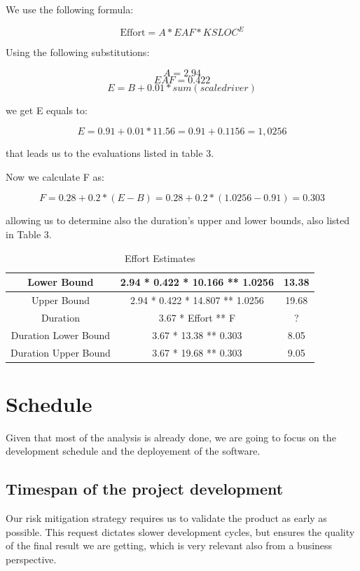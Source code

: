 \documentclass[11pt]{article} %
\begin{document}
We use the following formula:

$$ \text{Effort} = A * EAF * KSLOC ^ E $$

Using the following substitutions:

$$ A = 2.94 $$
$$ EAF = 0.422 $$
$$ E = B + 0.01 * sum(scale driver) $$

we get E equals to: 

$$ E = 0.91 + 0.01 * 11.56 = 0.91 + 0.1156 = 1,0256 $$

that leads us to the evaluations listed in table 3.

Now we calculate F as:

$$ F = 0.28 + 0.2 * (E - B) = 0.28 + 0.2 * (1.0256 - 0.91) = 0.303 $$

allowing us to determine also the duration's upper and lower bounds, also listed in Table 3.

\begin{table}[h]
\centering
\bgroup
\def\arraystretch{1.5}
	\begin{tabular}{| c | c | c |}
	\hline
	Lower Bound & 2.94 * 0.422 * 10.166 ** 1.0256 & 13.38 \\ \hline
	Upper Bound & 2.94 * 0.422 * 14.807 ** 1.0256 & 19.68 \\ \hline \hline
	Duration & 3.67 * Effort ** F & ? \\ \hline \hline
	Duration Lower Bound & 3.67 * 13.38 ** 0.303 & 8.05 \\ \hline
	Duration Upper Bound & 3.67 * 19.68 ** 0.303 & 9.05 \\ \hline
	\end{tabular}
\egroup
\caption{Effort Estimates}
\end{table}




\newpage
\section{Schedule}

Given that most of the analysis is already done, we are going to focus on the development schedule and the deployement of the software.

\subsection{Timespan of the project development}
Our risk mitigation strategy requires us to validate the product as early as possible. This request dictates slower development cycles, but ensures the quality of the final result we are getting, which is very relevant also from a business perspective. 
\end{document}

